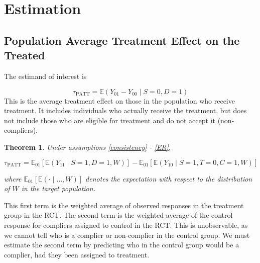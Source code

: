 \documentclass{article}
\newcommand{\ex}{\mathbb{E}} %
\theoremstyle{plain}
\newtheorem{theorem}{Theorem}
\begin{document}
\section{Estimation}
\subsection{Population Average Treatment Effect on the Treated}
The estimand of interest is 

\begin{equation}
\tau_{\text{PATT}} = \ex\left( Y_{01} - Y_{00} \mid S=0, D=1\right)
\end{equation}
This is the average treatment effect on those in the population who receive treatment.  It includes individuals who actually receive the treatment, but does not include those who are eligible for treatment and do not accept it (non-compliers).

\begin{theorem}
Under assumptions \eqref{consistency} - \eqref{ER},

$$\tau_{\text{PATT}} = \ex_{01}\left[  \ex\left(Y_{11} \mid S=1, D=1, W\right)\right]
-\ex_{01}\left[  \ex\left(Y_{10} \mid S=1, T=0, C=1, W\right) \right] $$

where $\ex_{01}\left[\ex(\cdot \mid\dots, W)\right]$ denotes the expectation with respect to the distribution of $W$ in the target population.  
\end{theorem}




This first term is the weighted average of observed responses in the treatment group in the RCT. The second term is the weighted average of the control response for compliers assigned to control in the RCT.  This is unobservable, as we cannot tell who is a complier or non-complier in the control group.  We must estimate the second term by predicting who in the control group would be a complier, had they been assigned to treatment. \\
\end{document}
